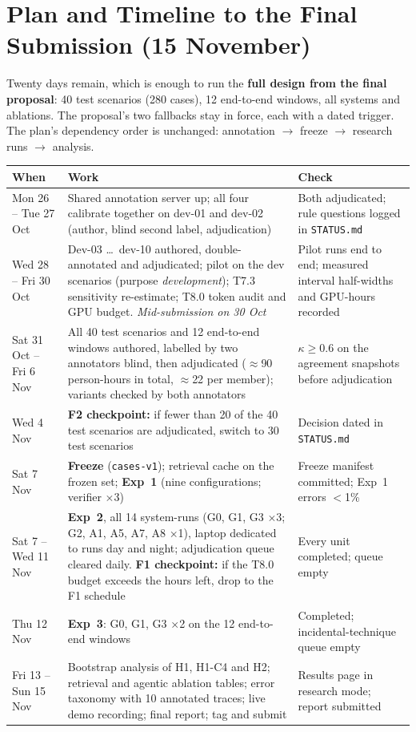 \documentclass[11pt,a4paper]{article}
\newcommand{\code}[1]{\texttt{\small #1}}
\begin{document}
\section{Plan and Timeline to the Final Submission (15 November)}
\label{sec:timeline}
Twenty days remain, which is enough to run the \textbf{full design from the final proposal}: 40 test scenarios (280 cases), 12 end-to-end windows, all systems and ablations. The proposal's two fallbacks stay in force, each with a dated trigger. The plan's dependency order is unchanged: annotation $\to$ freeze $\to$ research runs $\to$ analysis.

{\small
\begin{tabularx}{\linewidth}{@{}>{\raggedright\arraybackslash}p{2.7cm}L>{\raggedright\arraybackslash}p{3.5cm}@{}}
\toprule
\textbf{When} & \textbf{Work} & \textbf{Check}\\
\midrule
Mon 26 -- Tue 27 Oct & Shared annotation server up; all four calibrate together on dev-01 and dev-02 (author, blind second label, adjudication) & Both adjudicated; rule questions logged in \code{STATUS.md} \\
Wed 28 -- Fri 30 Oct & Dev-03 \dots\ dev-10 authored, double-annotated and adjudicated; pilot on the dev scenarios (purpose \emph{development}); T7.3 sensitivity re-estimate; T8.0 token audit and GPU budget. \emph{Mid-submission on 30 Oct} & Pilot runs end to end; measured interval half-widths and GPU-hours recorded \\
Sat 31 Oct -- Fri 6 Nov & All 40 test scenarios and 12 end-to-end windows authored, labelled by two annotators blind, then adjudicated ($\approx$90 person-hours in total, $\approx$22 per member); variants checked by both annotators & $\kappa\geq0.6$ on the agreement snapshots before adjudication \\
Wed 4 Nov & \textbf{F2 checkpoint:} if fewer than 20 of the 40 test scenarios are adjudicated, switch to 30 test scenarios & Decision dated in \code{STATUS.md} \\
Sat 7 Nov & \textbf{Freeze} (\code{cases-v1}); retrieval cache on the frozen set; \textbf{Exp~1} (nine configurations; verifier $\times$3) & Freeze manifest committed; Exp~1 errors $<$1\% \\
Sat 7 -- Wed 11 Nov & \textbf{Exp~2}, all 14 system-runs (G0, G1, G3 $\times$3; G2, A1, A5, A7, A8 $\times$1), laptop dedicated to runs day and night; adjudication queue cleared daily. \textbf{F1 checkpoint:} if the T8.0 budget exceeds the hours left, drop to the F1 schedule & Every unit completed; queue empty \\
Thu 12 Nov & \textbf{Exp~3}: G0, G1, G3 $\times$2 on the 12 end-to-end windows & Completed; incidental-technique queue empty \\
Fri 13 -- Sun 15 Nov & Bootstrap analysis of H1, H1-C4 and H2; retrieval and agentic ablation tables; error taxonomy with 10 annotated traces; live demo recording; final report; tag and submit & Results page in research mode; report submitted \\
\bottomrule
\end{tabularx}}
\end{document}
